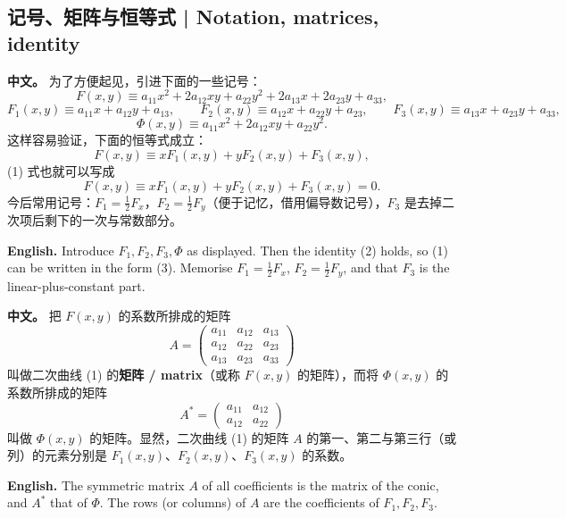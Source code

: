 \documentclass[UTF8,11pt,a4paper]{ctexart}
\newcommand{\APS}[2]{\par\noindent\textbf{中文。} #1\par\noindent\textbf{English.} #2\par\smallskip}
\theoremstyle{definition}
\begin{document}
\subsection{记号、矩阵与恒等式 | Notation, matrices, identity}
\APS{为了方便起见，引进下面的一些记号：
\[
F(x,y)\equiv a_{11}x^2+2a_{12}xy+a_{22}y^2+2a_{13}x+2a_{23}y+a_{33},
\]
\[
F_1(x,y)\equiv a_{11}x+a_{12}y+a_{13},\qquad F_2(x,y)\equiv a_{12}x+a_{22}y+a_{23},\qquad F_3(x,y)\equiv a_{13}x+a_{23}y+a_{33},
\]
\[
\Phi(x,y)\equiv a_{11}x^2+2a_{12}xy+a_{22}y^2.
\]
这样容易验证，下面的恒等式成立：
\[
F(x,y)\equiv xF_1(x,y)+yF_2(x,y)+F_3(x,y),\tag{2}
\]
(1) 式也就可以写成
\[
F(x,y)\equiv xF_1(x,y)+yF_2(x,y)+F_3(x,y)=0.\tag{3}
\]
今后常用记号：$F_1=\frac12F_x$，$F_2=\frac12F_y$（便于记忆，借用偏导数记号），$F_3$ 是去掉二次项后剩下的一次与常数部分。}{Introduce $F_1,F_2,F_3,\Phi$ as displayed. Then the identity (2) holds, so (1) can be written in the form (3). Memorise $F_1=\tfrac12F_x$, $F_2=\tfrac12F_y$, and that $F_3$ is the linear-plus-constant part.}

\APS{把 $F(x,y)$ 的系数所排成的矩阵
\[
A=\begin{pmatrix}a_{11}&a_{12}&a_{13}\\ a_{12}&a_{22}&a_{23}\\ a_{13}&a_{23}&a_{33}\end{pmatrix}
\]
叫做二次曲线 (1) 的\textbf{矩阵 / matrix}（或称 $F(x,y)$ 的矩阵），而将 $\Phi(x,y)$ 的系数所排成的矩阵
\[
A^*=\begin{pmatrix}a_{11}&a_{12}\\ a_{12}&a_{22}\end{pmatrix}
\]
叫做 $\Phi(x,y)$ 的矩阵。显然，二次曲线 (1) 的矩阵 $A$ 的第一、第二与第三行（或列）的元素分别是 $F_1(x,y)$、$F_2(x,y)$、$F_3(x,y)$ 的系数。}{The symmetric matrix $A$ of all coefficients is the matrix of the conic, and $A^*$ that of $\Phi$. The rows (or columns) of $A$ are the coefficients of $F_1,F_2,F_3$.}
\end{document}
